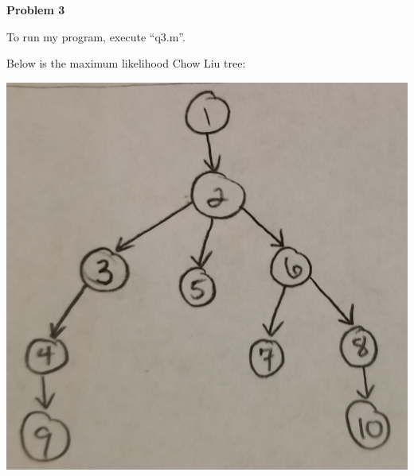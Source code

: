 \textbf{Problem 3}

To run my program, execute ``q3.m''.

Below is the maximum likelihood Chow Liu tree:

\includegraphics[scale=0.2]{q3}